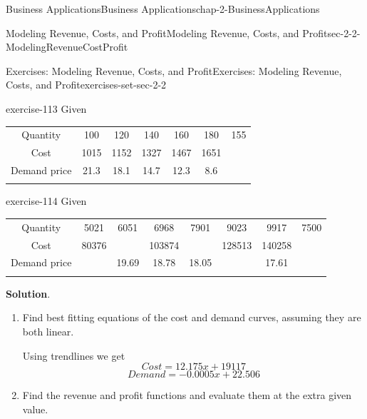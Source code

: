 \documentclass[oneside,10pt,]{book}
\numberwithin{equation}{section}
\newcommand{\hrulethin}  {\noalign{\hrule height 0.04em}}
\newcommand{\hrulemedium}{\noalign{\hrule height 0.07em}}
\newcommand{\hrulethick} {\noalign{\hrule height 0.11em}}
\begin{document}
\begin{chapterptx}{Business Applications}{}{Business Applications}{}{}{chap-2-BusinessApplications}
\begin{sectionptx}{Modeling Revenue, Costs, and Profit}{}{Modeling Revenue, Costs, and Profit}{}{}{sec-2-2-ModelingRevenueCostProfit}
\begin{exercises-subsection-numberless}{Exercises: Modeling Revenue, Costs, and Profit}{}{Exercises: Modeling Revenue, Costs, and Profit}{}{}{exercises-set-sec-2-2}
\begin{exercisegroup}
\begin{divisionexerciseeg}{10}{}{}{exercise-113}%
\hypertarget{p-755}{}%
Given%
\begin{sidebyside}{1}{0}{0}{0}%
\begin{sbspanel}{1}%
{\centering%
\begin{tabular}{ccccccc}\hrulethick
Quantity&100&120&140&160&180&155\tabularnewline\hrulethin
Cost&1015&1152&1327&1467&1651&\tabularnewline\hrulemedium
Demand price&21.3&18.1&14.7&12.3&8.6&\tabularnewline\hrulemedium
\end{tabular}
\par}
\end{sbspanel}%
\end{sidebyside}%
\end{divisionexerciseeg}%
\begin{divisionexerciseeg}{11}{}{}{exercise-114}%
\hypertarget{p-756}{}%
Given%
\begin{sidebyside}{1}{0}{0}{0}%
\begin{sbspanel}{1}%
{\centering%
\begin{tabular}{cccccccc}\hrulethick
Quantity&5021&6051&6968&7901&9023&9917&7500\tabularnewline\hrulethin
Cost&80376&&103874&&128513&140258&\tabularnewline\hrulemedium
Demand price&&19.69&18.78&18.05&&17.61&\tabularnewline\hrulemedium
\end{tabular}
\par}
\end{sbspanel}%
\end{sidebyside}%
\par\smallskip%
\noindent\textbf{Solution}.\hypertarget{solution-55}{}\quad%
\leavevmode%
\begin{enumerate}[label=(\alph*)]
\item\hypertarget{li-219}{}\hypertarget{p-757}{}%
Find best fitting equations of the cost and demand curves, assuming they are both linear.%
\par
\hypertarget{p-758}{}%
Using trendlines we get%
%
\begin{equation*}
Cost  = 12.175x + 19117
\end{equation*}
%
\begin{equation*}
Demand  = - 0.0005x + 22.506
\end{equation*}
\item\hypertarget{li-220}{}\hypertarget{p-759}{}%
Find the revenue and profit functions and evaluate them at the extra given value.%
\par

\end{enumerate}
\end{divisionexerciseeg}
\end{exercisegroup}
\end{exercises-subsection-numberless}
\end{sectionptx}
\end{chapterptx}
\end{document}
